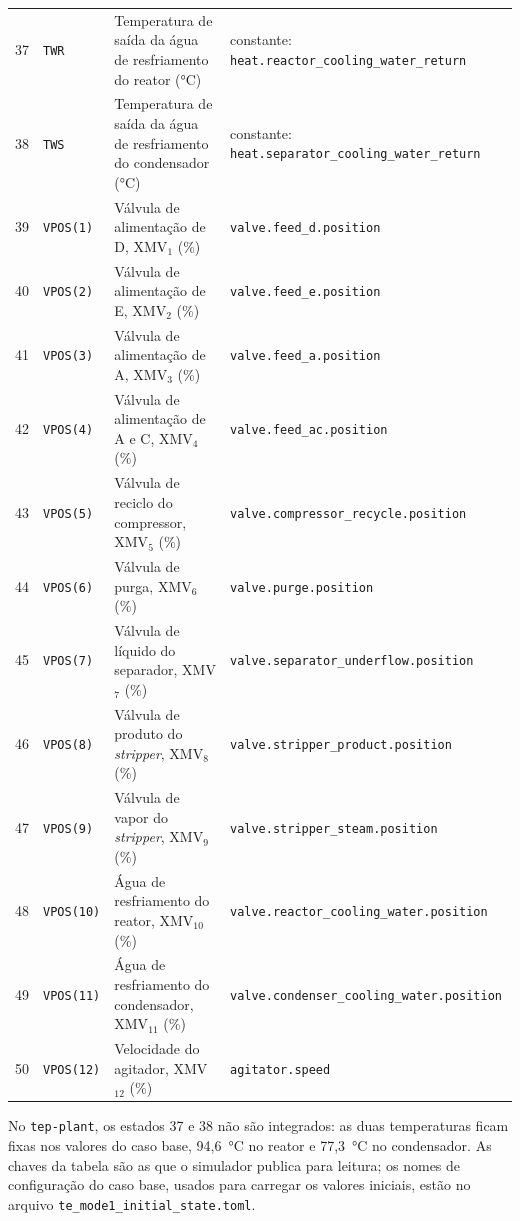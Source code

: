 \begin{longtable}{|c|l|>{\raggedright\arraybackslash}p{4.3cm}|>{\raggedright\arraybackslash}p{6.0cm}|}
	37     & \texttt{TWR}        & Temperatura de saída da água de resfriamento do reator (°C) & constante: \texttt{heat.\allowbreak{}reactor\_cooling\_water\_return} \\
	38     & \texttt{TWS}        & Temperatura de saída da água de resfriamento do condensador (°C) & constante: \texttt{heat.\allowbreak{}separator\_cooling\_water\_return} \\
	\hline
	39     & \texttt{VPOS(1)}    & Válvula de alimentação de D, XMV$_1$ (\%) & \texttt{valve.\allowbreak{}feed\_d.\allowbreak{}position} \\
	40     & \texttt{VPOS(2)}    & Válvula de alimentação de E, XMV$_2$ (\%) & \texttt{valve.\allowbreak{}feed\_e.\allowbreak{}position} \\
	41     & \texttt{VPOS(3)}    & Válvula de alimentação de A, XMV$_3$ (\%) & \texttt{valve.\allowbreak{}feed\_a.\allowbreak{}position} \\
	42     & \texttt{VPOS(4)}    & Válvula de alimentação de A e C, XMV$_4$ (\%) & \texttt{valve.\allowbreak{}feed\_ac.\allowbreak{}position} \\
	43     & \texttt{VPOS(5)}    & Válvula de reciclo do compressor, XMV$_5$ (\%) & \texttt{valve.\allowbreak{}compressor\_recycle.\allowbreak{}position} \\
	44     & \texttt{VPOS(6)}    & Válvula de purga, XMV$_6$ (\%) & \texttt{valve.\allowbreak{}purge.\allowbreak{}position} \\
	45     & \texttt{VPOS(7)}    & Válvula de líquido do separador, XMV$_7$ (\%) & \texttt{valve.\allowbreak{}separator\_underflow.\allowbreak{}position} \\
	46     & \texttt{VPOS(8)}    & Válvula de produto do \textit{stripper}, XMV$_8$ (\%) & \texttt{valve.\allowbreak{}stripper\_product.\allowbreak{}position} \\
	47     & \texttt{VPOS(9)}    & Válvula de vapor do \textit{stripper}, XMV$_9$ (\%) & \texttt{valve.\allowbreak{}stripper\_steam.\allowbreak{}position} \\
	48     & \texttt{VPOS(10)}   & Água de resfriamento do reator, XMV$_{10}$ (\%) & \texttt{valve.\allowbreak{}reactor\_cooling\_water.\allowbreak{}position} \\
	49     & \texttt{VPOS(11)}   & Água de resfriamento do condensador, XMV$_{11}$ (\%) & \texttt{valve.\allowbreak{}condenser\_cooling\_water.\allowbreak{}position} \\
	50     & \texttt{VPOS(12)}   & Velocidade do agitador, XMV$_{12}$ (\%) & \texttt{agitator.\allowbreak{}speed} \\
\end{longtable}
\endgroup
\vspace{-1.5em}

No \texttt{tep-plant}, os estados 37 e 38 não são integrados: as duas temperaturas ficam fixas nos valores do caso base, 94,6~°C no reator e 77,3~°C no condensador. As chaves da tabela são as que o simulador publica para leitura; os nomes de configuração do caso base, usados para carregar os valores iniciais, estão no arquivo \texttt{te\_mode1\_initial\_state.\allowbreak{}toml}.
